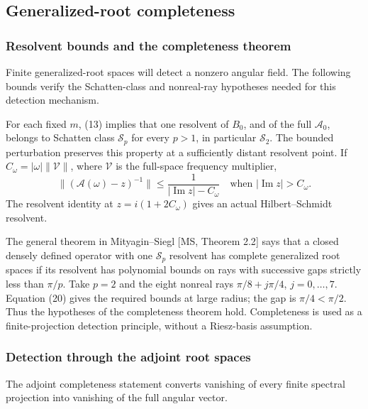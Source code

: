 \documentclass[11pt,a4paper]{article}
\begin{document}
\subsection{Generalized-root
completeness}\label{generalized-root-completeness}

\subsubsection{Resolvent bounds and the completeness theorem}\label{readable-root-completeness}

Finite generalized-root spaces will detect a nonzero angular field. The following bounds verify the Schatten-class and nonreal-ray hypotheses needed for this detection mechanism.

For each fixed \(m\), (13) implies that one resolvent of \(B_0\), and of
the full \(\mathcal A_0\), belongs to Schatten class \(\mathcal S_p\)
for every \(p>1\), in particular \(\mathcal S_2\). The bounded
perturbation preserves this property at a sufficiently distant resolvent
point. If \(C_\omega=|\omega|\|\mathcal V\|\), where \(\mathcal V\) is
the full-space frequency multiplier, \[
 \|(\mathcal A(\omega)-z)^{-1}\|
 \le\frac1{|\operatorname{Im}z|-C_\omega}
 \quad\text{when }|\operatorname{Im}z|>C_\omega .
 \tag{20}
\] The resolvent identity at \(z=i(1+2C_\omega)\) gives an actual
Hilbert--Schmidt resolvent.

The general theorem in Mityagin--Siegl {[}MS, Theorem 2.2{]} says that a
closed densely defined operator with one \(\mathcal S_p\) resolvent has
complete generalized root spaces if its resolvent has polynomial bounds
on rays with successive gaps strictly less than \(\pi/p\). Take \(p=2\)
and the eight nonreal rays \(\pi/8+j\pi/4\), \(j=0,\ldots,7\). Equation
(20) gives the required bounds at large radius; the gap is
\(\pi/4<\pi/2\). Thus the hypotheses of the completeness theorem hold.
Completeness is used as a finite-projection detection principle, without a Riesz-basis assumption.

\subsubsection{Detection through the adjoint root spaces}\label{readable-adjoint-detection}

The adjoint completeness statement converts vanishing of every finite spectral projection into vanishing of the full angular vector.
\end{document}
